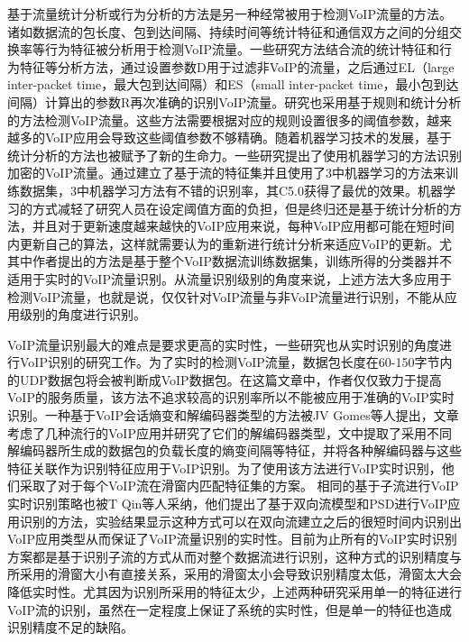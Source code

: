 基于流量统计分析或行为分析的方法是另一种经常被用于检测VoIP流量的方法。诸如数据流的包长度、包到达间隔、持续时间等统计特征和通信双方之间的分组交换率等行为特征被分析用于检测VoIP流量\supercite{2}。一些研究方法\supercite{19}结合流的统计特征和行为特征等分析方法，通过设置参数D用于过滤非VoIP的流量，之后通过EL（large inter-packet time，最大包到达间隔）和ES（small inter-packet time，最小包到达间隔）计算出的参数R再次准确的识别VoIP流量。研究\supercite{20,21}也采用基于规则和统计分析的方法检测VoIP流量。这些方法需要根据对应的规则设置很多的阈值参数，越来越多的VoIP应用会导致这些阈值参数不够精确。随着机器学习技术的发展，基于统计分析的方法也被赋予了新的生命力。一些研究\supercite{5}提出了使用机器学习的方法识别加密的VoIP流量。通过建立了基于流的特征集并且使用了3中机器学习的方法来训练数据集，3中机器学习方法有不错的识别率，其C5.0获得了最优的效果。机器学习的方式减轻了研究人员在设定阈值方面的负担，但是终归还是基于统计分析的方法，并且对于更新速度越来越快的VoIP应用来说，每种VoIP应用都可能在短时间内更新自己的算法，这样就需要认为的重新进行统计分析来适应VoIP的更新。尤其中作者提出的方法是基于整个VoIP数据流训练数据集，训练所得的分类器并不适用于实时的VoIP流量识别。从流量识别级别的角度来说，上述方法大多应用于检测VoIP流量，也就是说，仅仅针对VoIP流量与非VoIP流量进行识别，不能从应用级别的角度进行识别。

VoIP流量识别最大的难点是要求更高的实时性，一些研究也从实时识别的角度进行VoIP识别的研究工作。为了实时的检测VoIP流量，数据包长度在60-150字节内的UDP数据包将会被判断成VoIP数据包\supercite{3}。在这篇文章中，作者仅仅致力于提高VoIP的服务质量，该方法不追求较高的识别率所以不能被应用于准确的VoIP实时识别。一种基于VoIP会话熵变和解编码器类型的方法被JV Gomes等人提出\supercite{4}，文章考虑了几种流行的VoIP应用并研究了它们的解编码器类型，文中提取了采用不同解编码器所生成的数据包的负载长度的熵变间隔等特征，并将各种解编码器与这些特征关联作为识别特征应用于VoIP识别。为了使用该方法进行VoIP实时识别，他们采取了对于每个VoIP流在滑窗内匹配特征集的方案。
相同的基于子流进行VoIP实时识别策略也被T Qin等人采纳，他们提出了基于双向流模型和PSD进行VoIP应用识别的方法，实验结果显示这种方式可以在双向流建立之后的很短时间内识别出VoIP应用类型从而保证了VoIP流量识别的实时性\supercite{22}。目前为止所有的VoIP实时识别方案都是基于识别子流的方式从而对整个数据流进行识别，这种方式的识别精度与所采用的滑窗大小有直接关系，采用的滑窗太小会导致识别精度太低，滑窗太大会降低实时性。尤其因为识别所采用的特征太少，上述两种研究采用单一的特征进行VoIP流的识别，虽然在一定程度上保证了系统的实时性，但是单一的特征也造成识别精度不足的缺陷。

